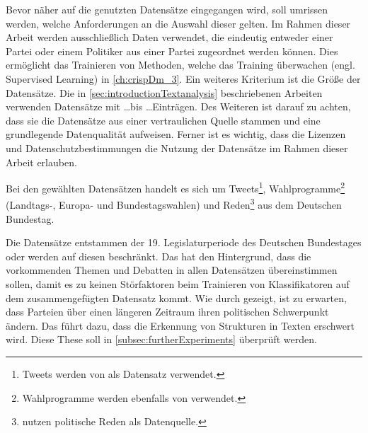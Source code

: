 
Bevor näher auf die genutzten Datensätze eingegangen wird, soll umrissen werden, welche Anforderungen an die Auswahl dieser gelten. Im Rahmen dieser Arbeit werden ausschließlich Daten verwendet, die eindeutig entweder einer Partei oder einem Politiker aus einer Partei zugeordnet werden können. Dies ermöglicht das Trainieren von Methoden, welche das Training überwachen (engl. Supervised Learning) in \autoref{ch:crispDm_3}. Ein weiteres Kriterium ist die Größe der Datensätze. Die in \autoref{sec:introductionTextanalysis} beschriebenen Arbeiten verwenden Datensätze mit \dots bis \dots Einträgen. Des Weiteren ist darauf zu achten, dass sie die Datensätze aus einer vertraulichen Quelle stammen und eine grundlegende Datenqualität aufweisen. Ferner ist es wichtig, dass die Lizenzen und Datenschutzbestimmungen die Nutzung der Datensätze im Rahmen dieser Arbeit erlauben.

Bei den  gewählten Datensätzen handelt es sich um Tweets\footnote{Tweets werden von \textcite{saltzer_bundestagswahl_2022, saltzer_finding_2022, guhr_training_2020, wong_quantifying_2016} als Datensatz verwendet.}, Wahlprogramme\footnote{Wahlprogramme werden ebenfalls von \textcite{biessmann_predicting_2016} verwendet.} (Landtags-, Europa- und Bundestagswahlen) und Reden\footnote{\textcite{doan_using_2022, biessmann_predicting_2016, simoes_fine-tuned_2020} nutzen politische Reden als Datenquelle.} aus dem Deutschen Bundestag.

Die Datensätze entstammen der 19. Legislaturperiode des Deutschen Bundestages oder werden auf diesen beschränkt. Das hat den Hintergrund, dass die vorkommenden Themen und Debatten in allen Datensätzen übereinstimmen sollen, damit es zu keinen Störfaktoren beim Trainieren von Klassifikatoren auf dem zusammengefügten Datensatz kommt. Wie durch \textcite{open_discourse_diskursanalyse_nodate} gezeigt, ist zu erwarten, dass Parteien über einen längeren Zeitraum ihren politischen Schwerpunkt ändern. Das führt dazu, dass die Erkennung von Strukturen in Texten erschwert wird. Diese These soll in \autoref{subsec:furtherExperiments} überprüft werden.


